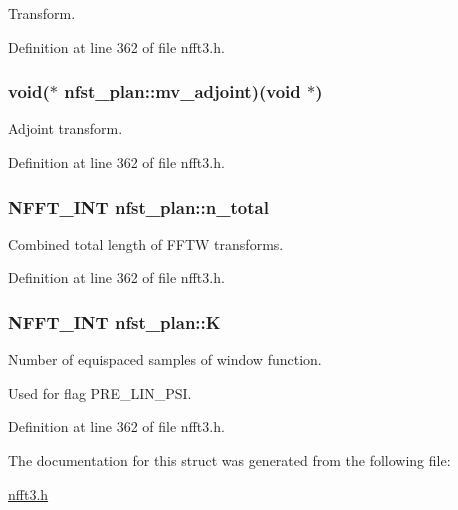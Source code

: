 Transform. 



Definition at line 362 of file nfft3.\-h.

\hypertarget{structnfst__plan_aedfe6da9afb5dc0457cc4f2197034fc0}{
\subsubsection[{mv\-\_\-adjoint}]{\setlength{\rightskip}{0pt plus 5cm}void($\ast$ nfst\-\_\-plan\-::mv\-\_\-adjoint)(void $\ast$)}}\label{structnfst__plan_aedfe6da9afb5dc0457cc4f2197034fc0}


Adjoint transform. 



Definition at line 362 of file nfft3.\-h.

\hypertarget{structnfst__plan_a48ac1a7152dfb32072bf59034422a4f4}{
\subsubsection[{n\-\_\-total}]{\setlength{\rightskip}{0pt plus 5cm}N\-F\-F\-T\-\_\-\-I\-N\-T nfst\-\_\-plan\-::n\-\_\-total}}\label{structnfst__plan_a48ac1a7152dfb32072bf59034422a4f4}


Combined total length of F\-F\-T\-W transforms. 



Definition at line 362 of file nfft3.\-h.

\hypertarget{structnfst__plan_a077a93c75660389fe050cbef10b0fb5c}{
\subsubsection[{K}]{\setlength{\rightskip}{0pt plus 5cm}N\-F\-F\-T\-\_\-\-I\-N\-T nfst\-\_\-plan\-::\-K}}\label{structnfst__plan_a077a93c75660389fe050cbef10b0fb5c}


Number of equispaced samples of window function. 

Used for flag P\-R\-E\-\_\-\-L\-I\-N\-\_\-\-P\-S\-I. 

Definition at line 362 of file nfft3.\-h.



The documentation for this struct was generated from the following file\-:\begin{DoxyCompactItemize}
\item 
\hyperlink{nfft3_8h}{nfft3.\-h}\end{DoxyCompactItemize}
